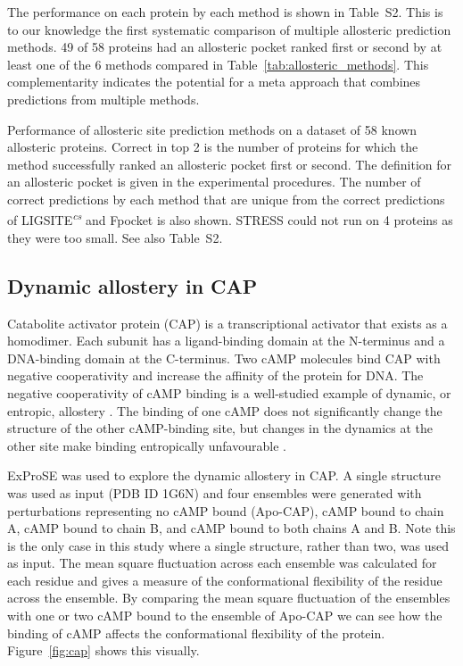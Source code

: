 The performance on each protein by each method is shown in Table~S2.
This is to our knowledge the first systematic comparison of multiple allosteric prediction methods.
49 of 58 proteins had an allosteric pocket ranked first or second by at least one of the 6 methods compared in Table~\ref{tab:allosteric_methods}.
This complementarity indicates the potential for a meta approach that combines predictions from multiple methods.


\begin{table}
\centering


\caption{Performance of allosteric site prediction methods on a dataset of 58 known allosteric proteins.
Correct in top 2 is the number of proteins for which the method successfully ranked an allosteric pocket first or second.
The definition for an allosteric pocket is given in the experimental procedures.
The number of correct predictions by each method that are unique from the correct predictions of LIGSITE\textsuperscript{\it cs} and Fpocket is also shown.
STRESS could not run on 4 proteins as they were too small.
See also Table~S2.}

\label{tab:allosteric_methods}
\end{table}


\subsection{Dynamic allostery in CAP}

Catabolite activator protein (CAP) is a transcriptional activator that exists as a homodimer.
Each subunit has a ligand-binding domain at the N-terminus and a DNA-binding domain at the C-terminus.
Two cAMP molecules bind CAP with negative cooperativity and increase the affinity of the protein for DNA.
The negative cooperativity of cAMP binding is a well-studied example of dynamic, or entropic, allostery \cite{Popovych2006}.
The binding of one cAMP does not significantly change the structure of the other cAMP-binding site, but changes in the dynamics at the other site make binding entropically unfavourable \cite{Popovych2006, Louet2015}.

ExProSE was used to explore the dynamic allostery in CAP.
A single structure was used as input (PDB ID 1G6N) and four ensembles were generated with perturbations representing no cAMP bound (Apo-CAP), cAMP bound to chain A, cAMP bound to chain B, and cAMP bound to both chains A and B.
Note this is the only case in this study where a single structure, rather than two, was used as input.
The mean square fluctuation across each ensemble was calculated for each residue and gives a measure of the conformational flexibility of the residue across the ensemble.
By comparing the mean square fluctuation of the ensembles with one or two cAMP bound to the ensemble of Apo-CAP we can see how the binding of cAMP affects the conformational flexibility of the protein.
Figure~\ref{fig:cap} shows this visually.

